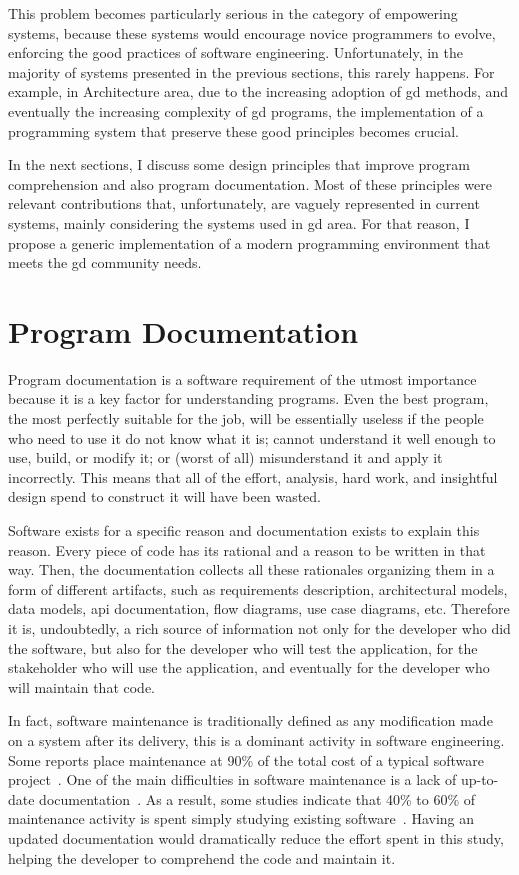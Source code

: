 This problem becomes particularly serious in the category of empowering systems, because these systems would encourage novice programmers to evolve, enforcing the good practices of software engineering. Unfortunately, in the majority of systems presented in the previous sections, this rarely happens. For example, in Architecture area, due to the increasing adoption of \gls{gd} methods, and eventually the increasing complexity of \gls{gd} programs, the implementation of a programming system that preserve these good principles becomes crucial.

In the next sections, I discuss some design principles that improve program comprehension and also program documentation. Most of these principles were relevant contributions that, unfortunately, are vaguely represented in current systems, mainly considering the systems used in \gls{gd} area. For that reason, I propose a generic implementation of a modern programming environment that meets the \gls{gd} community needs.

\section{Program Documentation}

Program documentation is a software requirement of the utmost importance because it is a key factor for understanding programs. Even the best program, the most perfectly suitable for the job, will be essentially useless if the people who need to use it do not know what it is; cannot understand it well enough to use, build, or modify it; or (worst of all) misunderstand it and apply it incorrectly. This means that all of the effort, analysis, hard work, and insightful design spend to construct it will have been wasted.

Software exists for a specific reason and documentation exists to explain this reason. Every piece of code has its rational and a reason to be written in that way. Then, the documentation collects all these rationales organizing them in a form of different artifacts, such as requirements description, architectural models, data models, \gls{api} documentation, flow diagrams, use case diagrams, etc. Therefore it is, undoubtedly, a rich source of information not only for the developer who did the software, but also for the developer who will test the application, for the stakeholder who will use the application, and eventually for the developer who will maintain that code.

In fact, software maintenance is traditionally defined as any modification made on a system after its delivery, this is a dominant activity in software engineering. Some reports place maintenance at 90\% of the total cost of a typical software project~\citep{seacord2003modernizing,pigoski1996practical}. One of the main difficulties in software maintenance is a lack of up-to-date documentation~\citep{de2005study}. As a result, some studies indicate that 40\% to 60\% of maintenance activity is spent simply studying existing software~\citep[p. 475 and p. 35 respectively]{pigoski1996practical,pfleeger1998software}. Having an updated documentation would dramatically reduce the effort spent in this study, helping the developer to comprehend the code and maintain it.

